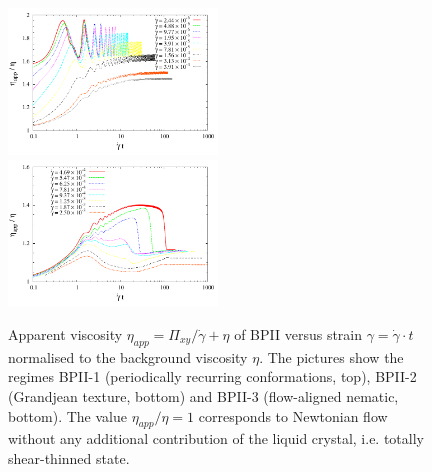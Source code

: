 \documentclass[8.5pt,twoside,twocolumn]{article}
\newcommand{\gd}{\dot{\gamma}}
\begin{document}
\begin{figure}[htpb]
\includegraphics[width=0.495\textwidth]{app_visc_strain_bp2_a.pdf}\\
\includegraphics[width=0.495\textwidth]{app_visc_strain_bp2_b.pdf}\\
\caption{
Apparent viscosity $\eta_{app}=\Pi_{xy}/\gd + \eta$ 
of BPII versus strain $\gamma = \gd\cdot t$  
normalised to the background viscosity $\eta$.
The pictures show the regimes BPII-1 (periodically recurring conformations, top), BPII-2 (Grandjean texture, bottom) and BPII-3 (flow-aligned nematic, bottom). 
The value $\eta_{app}/\eta=1$ corresponds to Newtonian flow without any additional contribution of the liquid crystal, i.e. totally shear-thinned state.
} 
\label{bp2-appvisc}
\end{figure}
\end{document}
